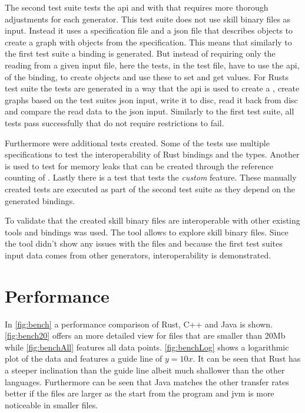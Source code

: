 \documentclass[thesis]{subfiles}
\begin{document}
  The second test suite tests the \gls{api} and with that requires more thorough adjustments for each generator.
  This test suite does not use \gls{skill} binary files as input.
  Instead it uses a specification file and a \gls{json} file that describes objects to create a graph with objects from the specification.
  This means that similarly to the first test suite a binding is generated.
  But instead of requiring only the reading from a given input file, here the tests, in the test file, have to use the \gls{api}, of the binding, to create objects and use these to set and get values.
  For Rusts test suite the tests are generated in a way that the \gls{api} is used to create a \SkillFile, create graphs based on the test suites \gls{json} input, write it to disc, read it back from disc and compare the read data to the \gls{json} input.
  Similarly to the first test suite, all tests pass successfully that do not require restrictions to fail.%

  Furthermore were additional tests created.
  Some of the tests use multiple specifications to test the interoperability of Rust bindings and the \Foreign types.
  Another is used to test for memory leaks that can be created through the reference counting of \PtrT.
  Lastly there is a test that tests the \emph{custom} feature.
  These manually created tests are executed as part of the second test suite as they depend on the generated bindings.

  To validate that the created \gls{skill} binary files are interoperable with other existing tools and bindings \autocite{skill-view} was used.
  The tool allows to explore \gls{skill} binary files.
  Since the tool didn't show any issues with the files and because the first test suites input data comes from other generators, interoperability is demonstrated.

\section{Performance}
  In \autoref{fig:bench} a performance comparison of Rust, C++ and Java is shown.
  \autoref{fig:bench20} offers an more detailed view for files that are smaller than 20Mb while \autoref{fig:benchAll} features all data points.
  \autoref{fig:benchLog} shows a logarithmic plot of the data and features a guide line of $y=10x$.
  It can be seen that Rust has a steeper inclination than the guide line albeit much shallower than the other languages.
  Furthermore can be seen that Java matches the other transfer rates better if the files are larger as the start from the program and \gls{jvm} is more noticeable in smaller files.
\end{document}
